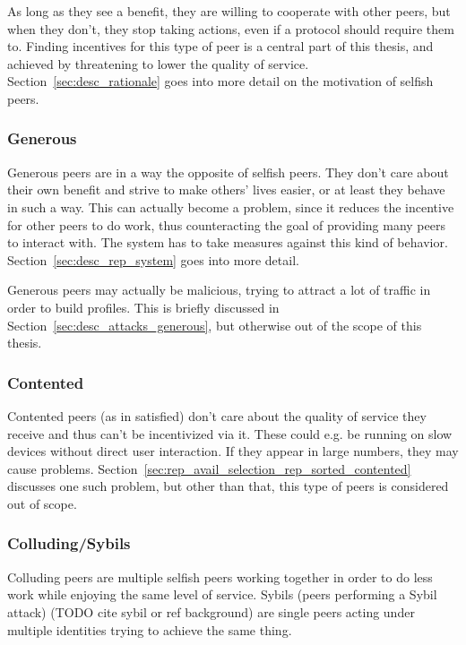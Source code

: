 As long as they see a benefit, they are willing to cooperate with other peers,
but when they don't, they stop taking actions, even if a protocol should require
them to. Finding incentives for this type of peer is a central part of this
thesis, and achieved by threatening to lower the quality of service.
Section~\ref{sec:desc_rationale} goes into more detail on the motivation of
selfish peers.

\subsubsection{Generous}
\label{sec:desc_generous_peers}
Generous peers are in a way the opposite of selfish peers. They don't care about
their own benefit and strive to make others' lives easier, or at least they
behave in such a way. This can actually become a problem, since it reduces the
incentive for other peers to do work, thus counteracting the goal of providing
many peers to interact with. The system has to take measures against this kind
of behavior. Section~\ref{sec:desc_rep_system} goes into more detail.

Generous peers may actually be malicious, trying to attract a lot of traffic in
order to build profiles. This is briefly discussed in
Section~\ref{sec:desc_attacks_generous}, but otherwise out of the scope of this
thesis.

\subsubsection{Contented}
\label{sec:desc_contented_peers}
Contented peers (as in satisfied) don't care about the quality of service they
receive and thus can't be incentivized via it. These could e.g. be running on
slow devices without direct user interaction. If they appear in large numbers,
they may cause problems.
Section~\ref{sec:rep_avail_selection_rep_sorted_contented} discusses one such
problem, but other than that, this type of peers is considered out of scope.

\subsubsection{Colluding/Sybils}
Colluding peers are multiple selfish peers working together in order to do less
work while enjoying the same level of service. Sybils (peers performing a Sybil
attack) (TODO cite sybil or ref background) are single peers acting under
multiple identities trying to achieve the same thing.

